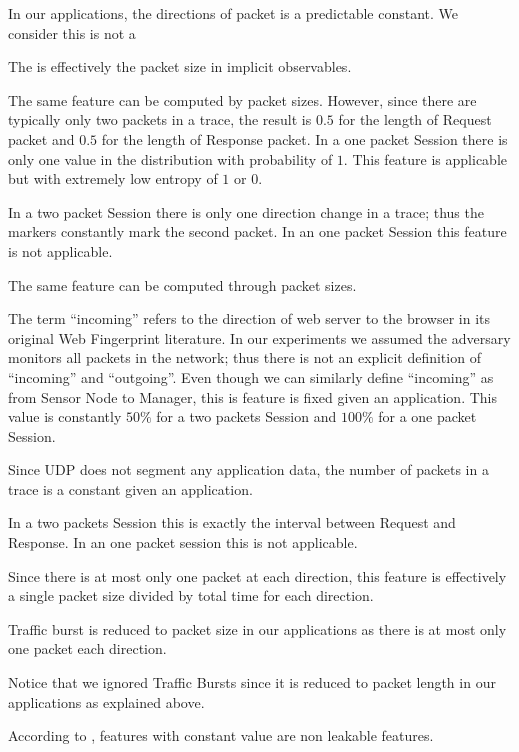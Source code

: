 \begin{description}[style=nextline]
	\item[Direction]
	In our applications, the directions of packet is a predictable constant. We consider this is not a 
	
	\item[Length]
	The is effectively the packet size in implicit observables.
	
	\item[Frequency Distribution of Length]
	The same feature can be computed by packet sizes. However, since there are typically only two packets in a trace, the result is $0.5$ for the length of Request packet and $0.5$ for the length of Response packet. In a one packet Session there is only one value in the distribution with probability of $1$. This feature is applicable but with extremely low entropy of $1$ or $0$.
	
	\item[Size, HTML and Number Markers]
	In a two packet Session there is only one direction change in a trace; thus the markers constantly mark the second packet. In an one packet Session this feature is not applicable.
	
	\item[Total Bytes]
	The same feature can be computed through packet sizes.
	
	\item[Percentage Incoming Packets]
	The term ``incoming'' refers to the direction of web server to the browser in its original Web Fingerprint literature. In our experiments we assumed the adversary monitors all packets in the network; thus there is not an explicit definition of ``incoming'' and ``outgoing''. Even though we can similarly define ``incoming'' as from Sensor Node to Manager, this is feature is fixed given an application. This value is constantly $50\%$ for a two packets Session and $100\%$ for a one packet Session.
	
	\item[Number of Packets]
	Since UDP does not segment any application data, the number of packets in a trace is a constant given an application. 
	
	\item[Total Time]
	In a two packets Session this is exactly the interval between Request and Response. In an one packet session this is not applicable.
	
	\item[Total Per-direction Bandwidth]
	Since there is at most only one packet at each direction, this feature is effectively a single packet size divided by total time for each direction.
	
	\item[Traffic Burst]
	Traffic burst is reduced to packet size in our applications as there is at most only one packet each direction.
\end{description}

Notice that we ignored Traffic Bursts since it is reduced to packet length in our applications as explained above.

According to , features with constant value are non leakable features. 